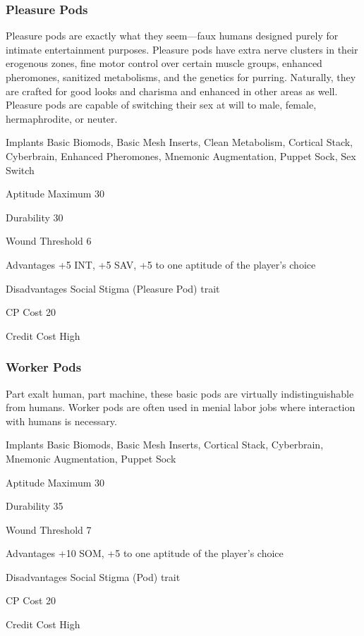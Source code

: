 \subsubsection{Pleasure Pods}
\label{sec:starting-pleasure-pods}

Pleasure pods are exactly what they seem—faux humans designed purely for intimate entertainment purposes. Pleasure pods have extra nerve clusters in their erogenous zones, fine motor control over certain muscle groups, enhanced pheromones, sanitized metabolisms, and the genetics for purring. Naturally, they are crafted for good looks and charisma and enhanced in other areas as well. Pleasure pods are capable of switching their sex at will to male, female, hermaphrodite, or neuter.

\begin{description*}
\item[Implants] Basic Biomods, Basic Mesh Inserts, Clean Metabolism, Cortical Stack, Cyberbrain, Enhanced Pheromones, Mnemonic Augmentation, Puppet Sock, Sex Switch
\item[Aptitude Maximum] 30 
\item[Durability] 30 
\item[Wound Threshold] 6 
\item[Advantages] +5 INT, +5 SAV, +5 to one aptitude of the player’s choice 
\item[Disadvantages] Social Stigma (Pleasure Pod) trait 
\item[CP Cost] 20 
\item[Credit Cost] High 
\end{description*}

\subsubsection{Worker Pods}
\label{sec:starting-worker-pods}

Part exalt human, part machine, these basic pods are virtually indistinguishable from humans. Worker pods are often used in menial labor jobs where interaction with humans is necessary.

\begin{description*}
\item[Implants] Basic Biomods, Basic Mesh Inserts, Cortical Stack, Cyberbrain, Mnemonic Augmentation, Puppet Sock
\item[Aptitude Maximum] 30 
\item[Durability] 35 
\item[Wound Threshold] 7 
\item[Advantages] +10 SOM, +5 to one aptitude of the player’s choice 
\item[Disadvantages] Social Stigma (Pod) trait 
\item[CP Cost] 20 
\item[Credit Cost] High 
\end{description*}

